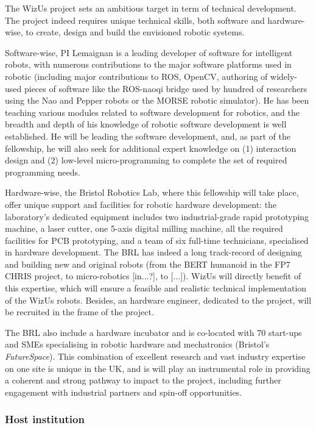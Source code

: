 \documentclass[11pt]{report}
\newcommand{\project}{WizUs\xspace}
\begin{document}
The \project project sets an ambitious target in term of technical development.
The project indeed requires unique technical skills, both software and
hardware-wise, to create, design and build the envisioned robotic systems.

Software-wise, PI Lemaignan is a leading
developer of software for intelligent robots, with numerous contributions to
the major software platforms used in robotic (including major contributions to
ROS, OpenCV, authoring of widely-used pieces of software like the ROS-naoqi
bridge used by hundred of researchers using the Nao and Pepper robots or the
MORSE robotic simulator). He has been teaching various modules related to
software development for robotics, and the breadth and depth of his knowledge of
robotic software development is well established. He will be leading the
software development, and, as part of the fellowship, he will also seek for
additional expert knowledge on (1) interaction design and (2) low-level
micro-programming to complete the set of required programming needs.

Hardware-wise, the Bristol Robotics Lab, where this fellowship will take place,
offer unique support and facilities for robotic hardware development: the
laboratory's dedicated equipment includes two industrial-grade rapid prototyping
machine, a laser cutter, one 5-axis digital milling machine, all the required
facilities for PCB prototyping, and a team of six full-time technicians,
specialised in hardware development. The BRL has indeed a long track-record of
designing and building new and original robots (from the BERT humanoid in the
FP7 CHRIS project, to micro-robotics [in...?], to [...]). \project will directly
benefit of this expertise, which will ensure a feasible and realistic technical
implementation of the \project robots. Besides, an hardware engineer, dedicated
to the project, will be recruited in the frame of the project.

The BRL also include a hardware incubator and is co-located with 70 start-ups
and SMEs specialising in robotic hardware and mechatronics (Bristol's
\emph{FutureSpace}). This combination of excellent research and vast industry
expertise on one site is unique in the UK, and is will play an instrumental role
in providing a coherent and strong pathway to impact to the project, including
further engagement with industrial partners and spin-off opportunities.


\hypertarget{host-institution}{%
\subsubsection{Host institution}\label{host-institution}}
\end{document}
